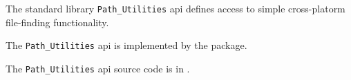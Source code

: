 
The standard library {\tt Path\_Utilities} api defines access to simple cross-platorm file-finding functionality.

The {\tt Path\_Utilities} api is implemented by the  package.

The {\tt Path\_Utilities} api source code is in .


